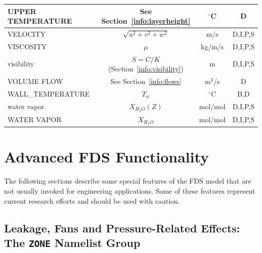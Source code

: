 \documentclass[11pt]{book}
\begin{document}
\begin{table}[h!]
\begin{center}
\begin{tabular}{|l|c|c|c|}
{\ct UPPER TEMPERATURE}                         & See Section~\ref{info:layerheight}            & $^\circ$C      & D            \\ \hline
{\ct VELOCITY}                                  & $\sqrt{u^2+v^2+w^2}$                          & m/s            & D,I,P,S      \\ \hline
{\ct VISCOSITY}                                 & $\mu$                                         & kg/m/s         & D,I,P,S      \\ \hline
{\ct visibility}                                & $S=C/K$ (Section~\ref{info:visibility})       & m              & D,I,P,S      \\ \hline
{\ct VOLUME FLOW}                               & See Section~\ref{info:flows}                  & m$^3$/s        & D            \\ \hline
{\ct WALL\_TEMPERATURE}                         & $T_w$                                         & $^\circ$C      & B,D          \\ \hline
{\ct water vapor}                               & $X_{H_2O}(Z)$                                 & mol/mol        & D,I,P,S      \\ \hline
{\ct WATER VAPOR}                               & $X_{H_2O}$                                    & mol/mol        & D,I,P,S      \\ \hline
\end{tabular}
\end{center}
\end{table}






\clearpage


\chapter{Advanced FDS Functionality}

The following sections describe some special features of the FDS model that
are not usually invoked for engineering applications. Some of these features
represent current research efforts and should be used with caution.

\section{Leakage, Fans and Pressure-Related Effects: The \texorpdfstring{{\tt ZONE}}{ZONE} Namelist Group}
\label{info:ZONE}
\end{document}
